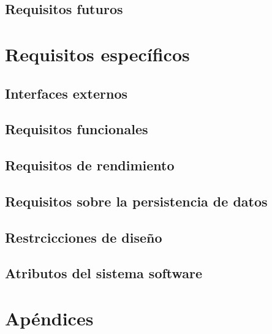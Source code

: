 \documentclass{article}
\begin{document}
\subsection{Requisitos futuros}
\section{Requisitos específicos}
\subsection{Interfaces externos}
\subsection{Requisitos funcionales}
\subsection{Requisitos de rendimiento}
\subsection{Requisitos sobre la persistencia de datos}
\subsection{Restrcicciones de diseño}
\subsection{Atributos del sistema software}

\section*{Apéndices}
\end{document}
